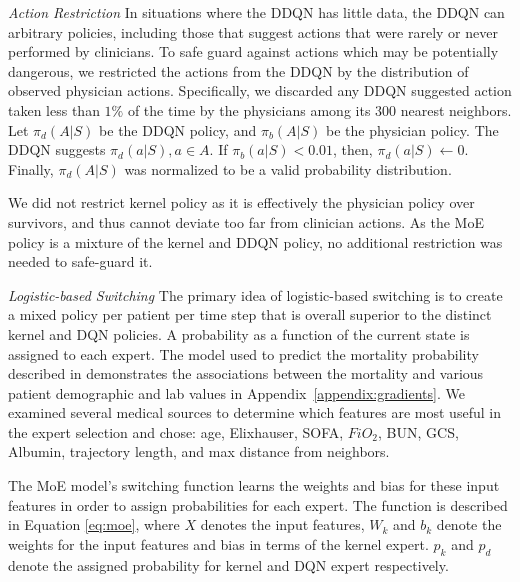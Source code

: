 \documentclass[10pt]{amia}
\begin{document}
\textit{Action Restriction}
In situations where the DDQN has little data, the DDQN can arbitrary policies, including those that suggest actions that were rarely or never performed by clinicians.  To safe guard against actions which may be potentially dangerous, we restricted the actions from the DDQN by the distribution of observed physician actions.  Specifically, we discarded any DDQN suggested action taken less than $1\%$ of the time by the physicians among its 300 nearest neighbors. Let $\pi_{d}(A|S)$ be the DDQN policy, and $\pi_{b}(A|S)$ be the physician policy. The DDQN suggests $\pi_{d}(a|S), a \in A$. If $\pi_{b}(a|S) < 0.01$, then, $\pi_{d}(a|S) \leftarrow 0$. Finally, $\pi_{d}(A|S)$ was normalized to be a valid probability distribution.

We did not restrict kernel policy as it is effectively the physician policy over survivors, and thus cannot deviate too far from clinician actions.  As the MoE policy is a mixture of the kernel and DDQN policy, no additional restriction was needed to safe-guard it.

\textit{Logistic-based Switching}
The primary idea of logistic-based switching is to create a mixed policy per patient per time step that is overall superior to the distinct kernel and DQN policies. A probability as a function of the current state is assigned to each expert. The model used to predict the mortality probability described in  demonstrates the associations between the mortality and various patient demographic and lab values in Appendix~\ref{appendix:gradients}. We examined several medical sources \cite{jones2009sequential,beier2011elevation,tamion2010albumin} to determine which features are most useful in the expert selection and chose: age, Elixhauser, SOFA, $FiO_{2}$, BUN, GCS, Albumin, trajectory length, and max distance from neighbors. 

The MoE model's switching function learns the weights and bias for these input features in order to assign probabilities for each expert. The function is described in Equation \ref{eq:moe}, where $X$ denotes the input features, $W_{k}$ and $b_{k}$ denote the weights for the input features and bias in terms of the kernel expert. $p_{k}$ and $p_{d}$ denote the assigned probability for kernel and DQN expert respectively. 

\end{document}
